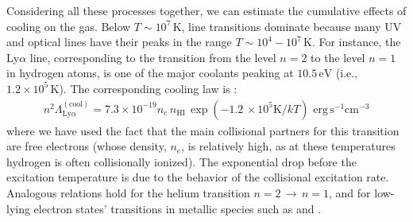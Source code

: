 Considering all these processes together, we can estimate the cumulative effects of cooling on the gas. Below $T \sim 10^7\,\mathrm{K}$, line transitions dominate because many UV and optical lines have their peaks in the range $T \sim 10^4-10^7\,\mathrm{K}$. For instance, the Ly$\alpha$ line, corresponding to the transition from the level $n=2$ to the level $n=1$ in hydrogen atoms, is one of the major coolants peaking at $10.5 \,\mathrm{eV}$ (i.e., $1.2\times 10^5\,\mathrm{K}$). The corresponding cooling law is \citep{tielens2005book}:
\begin{align}
    n^2 \Lambda^{\mathrm{(cool)}}_{\mathrm{Ly}\alpha} = 7.3\times10^{-19} n_e \,n_\mathrm{HI} \,\exp(-1.2\,\times 10^5\mathrm{K}/kT)\,\,\mathrm{erg}\,\mathrm{s}^{-1}\mathrm{cm}^{-3}
\end{align}
where we have used the fact that the main collisional partners for this transition are free electrons (whose density, $n_e$, is relatively high, as at these temperatures hydrogen is often collisionally ionized). The exponential drop before the excitation temperature is due to the behavior of the collisional excitation rate. Analogous relations hold for the helium transition $n=2\, \rightarrow\,n=1$, and for low-lying electron states' transitions in metallic species such as \OIIIion and \NIIion. 

